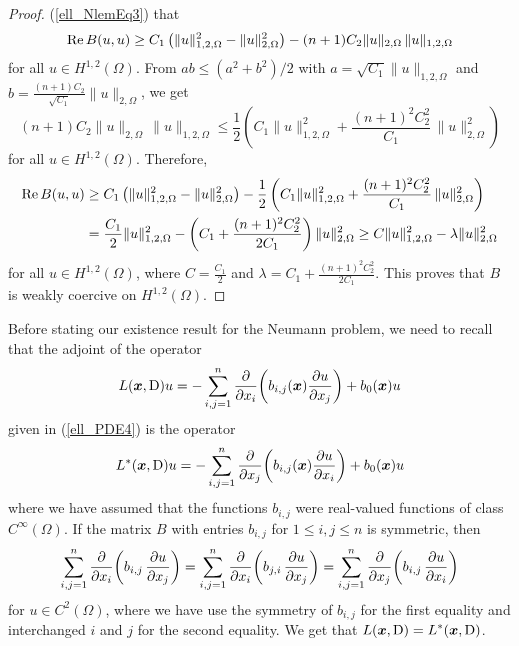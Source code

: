 \begin{proof}
(\ref{ell_NlemEq3}) that
\[
\RE B(u,u) \geq C_1 \left( \|u\|_{1,2,\Omega}^2 - \|u\|_{2,\Omega}^2 \right) -
(n+1)C_2 \|u\|_{2,\Omega} \, \|u\|_{1,2,\Omega}
\]
for all $\displaystyle u \in H^{1,2}(\Omega)$.  From
$\displaystyle ab \leq (a^2+b^2)/2$ with
$\displaystyle a = \sqrt{C_1} \|u\|_{1,2,\Omega}$ and
$\displaystyle b = \frac{(n+1)C_2}{\sqrt{C_1}} \|u\|_{2,\Omega}$, we get
\[
(n+1)C_2 \|u\|_{2,\Omega} \, \|u\|_{1,2,\Omega}
\leq \frac{1}{2} \left(
C_1 \|u\|_{1,2,\Omega}^2 + \frac{(n+1)^2C_2^2}{C_1} \, \|u\|_{2,\Omega}^2 \right)
\]
for all $\displaystyle u \in H^{1,2}(\Omega)$.  Therefore,
\begin{align*}
\RE B(u,u) &\geq C_1 \left( \|u\|_{1,2,\Omega}^2 - \|u\|_{2,\Omega}^2 \right) -
\frac{1}{2} \left(
C_1 \|u\|_{1,2,\Omega}^2 + \frac{(n+1)^2C_2^2}{C_1} \,
\|u\|_{2,\Omega}^2 \right) \\
&= \frac{C_1}{2} \|u\|_{1,2,\Omega}^2 -
\left( C_1 + \frac{(n+1)^2C_2^2}{2C_1}\right) \|u\|_{2,\Omega}^2
\geq C \|u\|_{1,2,\Omega}^2 - \lambda \|u\|_{2,\Omega}^2
\end{align*}
for all $\displaystyle u \in H^{1,2}(\Omega)$, where
$\displaystyle C= \frac{C_1}{2}$ and
$\displaystyle \lambda = C_1 + \frac{(n+1)^2C_2^2}{2C_1}$.
This proves that $B$ is weakly coercive on $\displaystyle H^{1,2}(\Omega)$.
\end{proof}

Before stating our existence result for the Neumann problem, we need to
recall that the adjoint of the operator
\[
L(\VEC{x}, \diff)u = -\sum_{i,j=1}^n
\pdfdx{\left( b_{i,j}(\VEC{x}) \pdydx{u}{x_j} \right)}{x_i} + b_0(\VEC{x})u
\]
given in (\ref{ell_PDE4}) is the operator
\[
L^\ast(\VEC{x}, \diff)u = -\sum_{i,j=1}^n
\pdfdx{\left( b_{i,j}(\VEC{x}) \pdydx{u}{x_i} \right)}{x_j} + b_0(\VEC{x})u
\]
where we have assumed that the functions $b_{i,j}$ were real-valued
functions of class $\displaystyle C^\infty(\Omega)$.  If the
matrix $B$ with entries $b_{i,j}$ for $1\leq i,j\leq n$ is symmetric, then
\[
\sum_{i,j=1}^n \pdfdx{\left( b_{i,j}\,\pdydx{u}{x_j}\right)}{x_i}
= \sum_{i,j=1}^n \pdfdx{\left( b_{j,i}\,\pdydx{u}{x_j}\right)}{x_i}
= \sum_{i,j=1}^n \pdfdx{\left( b_{i,j}\,\pdydx{u}{x_i}\right)}{x_j}
\]
for $\displaystyle u \in C^2(\Omega)$, where we have use the symmetry
of $b_{i,j}$ for the first equality and interchanged $i$ and $j$ for
the second equality.  We get that
$\displaystyle L(\VEC{x},\diff) = L^\ast(\VEC{x},\diff)$.

